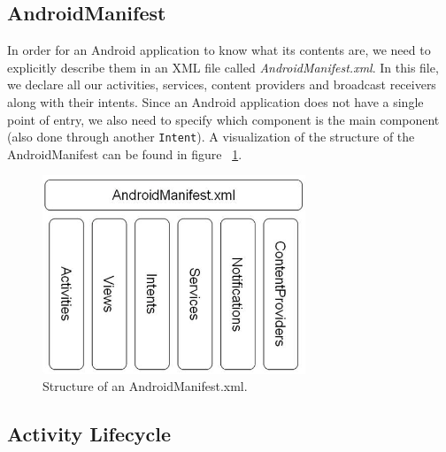 \subsection{AndroidManifest}

In order for an Android application to know what its contents are, we need to explicitly describe them in an XML file called \textit{AndroidManifest.xml}. In this file, we declare all our activities, services, content providers and broadcast receivers along with their intents. Since an Android application does not have a single point of entry, we also need to specify which component is the main component (also done through another \texttt{Intent}). A visualization of the structure of the AndroidManifest can be found in figure ~\ref{fig:android_manifest}.

\begin{figure}[h!]
\centering
\includegraphics[width=0.7\textwidth]{images/chap4_android_manifest.png}
\caption{Structure of an AndroidManifest.xml.}
\label{fig:android_manifest}
\end{figure}

\subsection{Activity Lifecycle}

